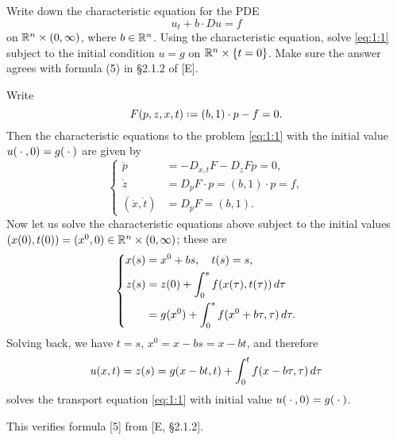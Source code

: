 \begin{problem}
  Write down the characteristic equation for the PDE
  \[
    \label{eq:1:1}
    \tag{\(*\)}
    u_t+b\cdot Du=f
  \]
  on \(\mathbb{R}^n\times(0,\infty)\), where \(b\in\mathbb{R}^n\). Using the
  characteristic equation, solve \eqref{eq:1:1} subject to the initial
  condition \(u=g\) on \(\mathbb{R}^n\times\{t=0\}\). Make sure the answer agrees
  with formula (5) in \S 2.1.2 of [E].
\end{problem}
\begin{solution*}
  Write
  \[
    F(p,z,x,t)\defeq (b,1)\cdot p-f=0.
  \]
  Then the characteristic equations to the problem \eqref{eq:1:1} with the
  initial value \(u({}\cdot{},0)=g({}\cdot{})\) are given by
  \[
    \left\{
      \begin{aligned}
        \dot p&=-D_{x,t}F-D_zFp=0,\\
        \dot z&=D_pF\cdot p=(b,1)\cdot p=f,\\
        (\dot x,\dot t)&=D_pF=(b,1).
      \end{aligned}
    \right.
  \]
  Now let us solve the characteristic equations above subject to the
  initial values \((x(0),t(0))=(x^0,0)\in\mathbb{R}^n\times(0,\infty)\);
  these are
  \[
    \left\{
      \begin{aligned}
        x(s)
        &=x^0+bs,\quad t(s)=s,\\
        z(s)
        &=z(0)+\int_0^s f(x(\tau),t(\tau))\mathop{}\!d\tau\\
        &=g(x^0)+\int_0^s f(x^0+b\tau,\tau)\mathop{}\!d\tau.
      \end{aligned}
    \right.
  \]
  Solving back, we have \(t=s\), \(x^0=x-bs=x-bt\), and therefore
  \[
    u(x,t)=z(s)=g(x-bt,t)+\int_0^t f(x-b\tau, \tau)\mathop{}\!d\tau
  \]
  solves the transport equation \eqref{eq:1:1} with initial value
  \(u({}\cdot{},0)=g({}\cdot{})\).

  This verifies formula [5] from [E, \S 2.1.2].
\end{solution*}

